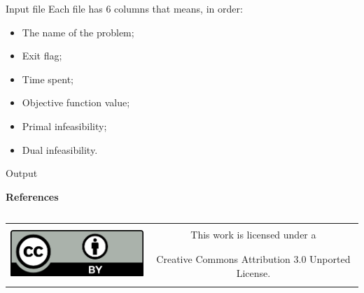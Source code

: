 \documentclass[]{beamer}
\begin{document}
\begin{frame}[t,fragile]
\begin{columns}[t]
\begin{column}{0.4\textwidth}
\begin{block}{Input file}
        Each file has 6 columns that means, in order:
        \begin{itemize}
          \item The name of the problem;
          \item Exit flag;
          \item Time spent;
          \item Objective function value;
          \item Primal infeasibility;
          \item Dual infeasibility.
        \end{itemize}
      \end{block}

      \begin{block}{Output}

      
      \end{block}

      \textbf{References}

      \printbibliography
    \end{column}
  \end{columns}
  \vfill
  \begin{center}
    \begin{tabular}[]{cc}
      \multirow{2}{*}{\includegraphics[height=60pt]{figures/cc-by}} &
      \Large{This work is licensed under a}\\ &
      \Large{Creative Commons Attribution 3.0 Unported License.}
    \end{tabular}
  \end{center}
\end{frame}
\end{document}
